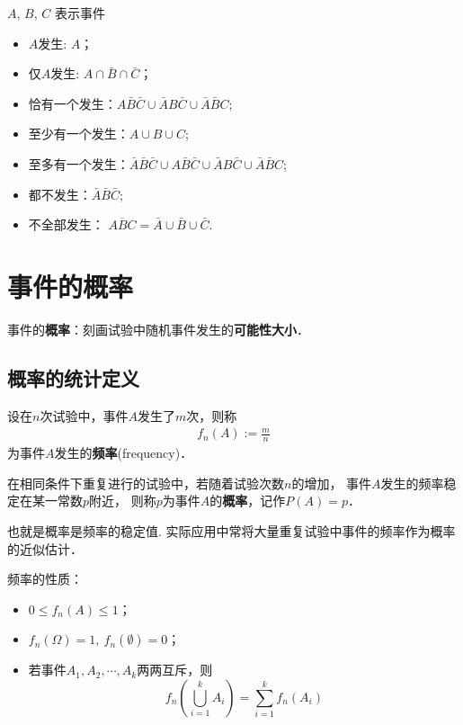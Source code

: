 \begin{example}
    $A$, $B$, $C$ 表示事件
    \begin{itemize}
        \item $A$发生: $A$；
        \item 仅$A$发生: $A\cap \bar{B}\cap \bar{C}$；
        \item 恰有一个发生：$A \bar B \bar C\cup \bar AB\bar C\cup \bar A\bar BC$;
        \item 至少有一个发生：$A\cup B\cup C$;
        \item 至多有一个发生：$\bar A\bar B\bar C\cup A \bar B \bar C \cup \bar AB\bar C\cup \bar A\bar BC$;
        \item 都不发生：$\bar A\bar B\bar C$;
        \item 不全部发生： $\overline{ABC}=\bar A\cup \bar B\cup \bar C$.
    \end{itemize}
\end{example}

\section{事件的概率}

事件的\textbf{概率}：刻画试验中随机事件发生的\textbf{可能性大小}．

\subsection{概率的统计定义}
\begin{definition}
    设在$n$次试验中，事件$A$发生了$m$次，则称
    \begin{align*}
        f_n(A):=\frac{m}{n}
    \end{align*}
    为事件$A$发生的\textbf{频率}(frequency)．
\end{definition}

\begin{definition}%
    在相同条件下重复进行的试验中，若随着试验次数$n$的增加，
    事件$A$发生的频率稳定在某一常数$p$附近，
    则称$p$为事件$A$的\textbf{概率}，记作$P(A)=p$．
\end{definition}
也就是概率是频率的稳定值. 实际应用中常将大量重复试验中事件的频率作为概率的近似估计．

\begin{proposition}[事件的频率]
    频率的性质：
    \begin{itemize}
        \item $0\le f_n(A)\le 1$；
        \item $f_n(\Omega)=1,\ f_n(\emptyset)=0$；
        \item 若事件$A_1, A_2, \cdots, A_k$两两互斥，则
              $$f_n \left( \bigcup_{i=1}^k A_i \right)=\sum_{i=1}^k f_n(A_i)$$
    \end{itemize}
\end{proposition}

